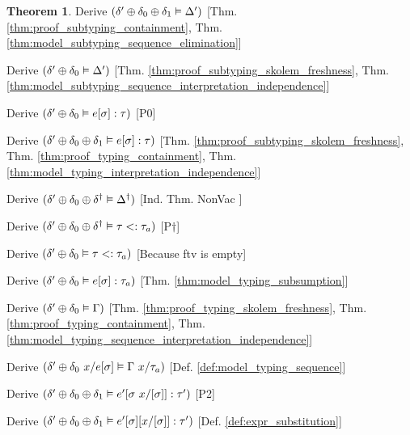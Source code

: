 \documentclass[acmsmall]{acmart}
\theoremstyle{definition}
\newtheorem{theorem}{Theorem}[section]
\begin{document}
\begin{theorem}
  \item \I\I \N Derive $(
    \delta' \oplus \delta_0 \oplus \delta_1 \vDash \Delta'
  )$ [Thm. \ref{thm:proof_subtyping_containment}, Thm. \ref{thm:model_subtyping_sequence_elimination}]
  \item \I\I \N Derive $(
    \delta' \oplus \delta_0 \vDash \Delta'
  )$ [Thm. \ref{thm:proof_subtyping_skolem_freshness}, Thm. \ref{thm:model_subtyping_sequence_interpretation_independence}]
  \item \I\I \N Derive $(
    \delta' \oplus \delta_0 \vDash e[\sigma] : \tau
  )$ [P0]
  \item \I\I \N Derive $(
    \delta' \oplus \delta_0 \oplus \delta_1 \vDash e[\sigma] : \tau
  )$ [Thm. \ref{thm:proof_subtyping_skolem_freshness}, 
      Thm. \ref{thm:proof_typing_containment},
      Thm. \ref{thm:model_typing_interpretation_independence}]

  \item \I\I \N Derive $(
    \delta' \oplus \delta_0 \oplus \delta^\dagger \vDash \Delta^\dagger
  )$ [Ind. Thm. NonVac ]

  \item \I\I \N Derive $(
    \delta' \oplus \delta_0 \oplus \delta^\dagger \vDash \tau <: \tau_a
  )$ [P$\dagger$]

  \item \I\I \N Derive $(
    \delta' \oplus \delta_0 \vDash \tau <: \tau_a
  )$ [Because ftv is empty]

  \item \I\I \N Derive $(
    \delta' \oplus \delta_0 \vDash e[\sigma] : \tau_a
  )$ [Thm. \ref{thm:model_typing_subsumption}]

  \item \I\I \N Derive $(
    \delta' \oplus \delta_0 \vDash \Gamma
  )$ [Thm. \ref{thm:proof_typing_skolem_freshness},
      Thm. \ref{thm:proof_typing_containment},
      Thm. \ref{thm:model_typing_sequence_interpretation_independence}]

  \item \I\I \N Derive $(
    \delta' \oplus \delta_0\ x \slash e[\sigma] \vDash \Gamma\ x \slash \tau_a
  )$ [Def. \ref{def:model_typing_sequence}]

  \item \I\I \N Derive $(
    \delta' \oplus \delta_0 \oplus \delta_1 \satisfies e'[\sigma\ x\slash[\sigma]] \hastype \tau'
  )$ [P2]

  \item \I\I \N Derive $(
    \delta' \oplus \delta_0 \oplus \delta_1 \vDash e'[\sigma][x\slash[\sigma]] : \tau'
  )$ [Def. \ref{def:expr_substitution}]


\end{theorem}
\end{document}
